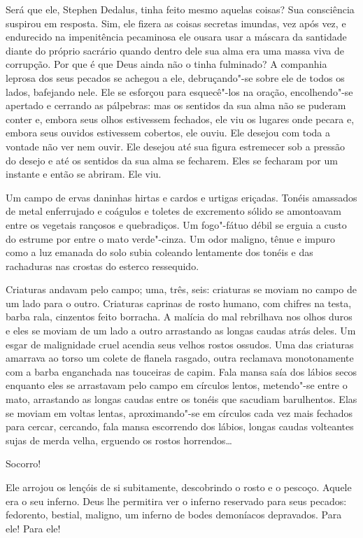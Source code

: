 Será que ele, Stephen Dedalus, tinha feito mesmo aquelas coisas? Sua
consciência suspirou em resposta. Sim, ele fizera as coisas secretas
imundas, vez após vez, e endurecido na impenitência pecaminosa ele
ousara usar a máscara da santidade diante do próprio sacrário quando
dentro dele sua alma era uma massa viva de corrupção. Por que é que
Deus ainda não o tinha fulminado? A companhia leprosa dos seus pecados
se achegou a ele, debruçando"-se sobre ele de todos os lados, bafejando
nele. Ele se esforçou para esquecê"-los na oração, encolhendo"-se
apertado e cerrando as pálpebras: mas os sentidos da sua alma não se
puderam conter e, embora seus olhos estivessem fechados, ele viu os
lugares onde pecara e, embora seus ouvidos estivessem cobertos, ele
ouviu. Ele desejou com toda a vontade não ver nem ouvir. Ele desejou
até sua figura estremecer sob a pressão do desejo e até os sentidos da
sua alma se fecharem. Eles se fecharam por um instante e então se
abriram. Ele viu.

Um campo de ervas daninhas hirtas e cardos e urtigas eriçadas. Tonéis
amassados de metal enferrujado e coágulos e toletes		
de excremento sólido se amontoavam entre os vegetais rançosos e
quebradiços. Um fogo"-fátuo débil se erguia a custo do estrume por entre
o mato verde"-cinza. Um odor maligno, tênue e impuro como a luz emanada
do solo subia coleando lentamente dos tonéis e das rachaduras nas
crostas do esterco ressequido.

Criaturas andavam pelo campo; uma, três, seis: criaturas se moviam no
campo de um lado para o outro. Criaturas caprinas de rosto
humano, com chifres na testa, barba rala, cinzentos feito borracha. A
malícia do mal rebrilhava nos olhos duros e eles se moviam de um lado a
outro arrastando as longas caudas atrás deles. Um esgar de malignidade
cruel acendia seus velhos rostos ossudos. Uma das criaturas amarrava ao
torso um colete de flanela rasgado, outra reclamava monotonamente com a
barba enganchada nas touceiras de capim. Fala mansa saía dos lábios
secos enquanto eles se arrastavam pelo campo em círculos lentos,
metendo"-se entre o mato, arrastando as longas caudas entre os tonéis
que sacudiam barulhentos. Elas se moviam em voltas lentas,
aproximando"-se em círculos cada vez mais fechados para cercar,
cercando, fala mansa escorrendo dos lábios, longas caudas volteantes
sujas de merda velha, erguendo os rostos horrendos\ldots{}

Socorro!

Ele arrojou os lençóis de si subitamente, descobrindo o rosto e o
pescoço. Aquele era o seu inferno. Deus lhe permitira ver o inferno
reservado para seus pecados: fedorento, bestial, maligno, um inferno de
bodes demoníacos depravados. Para ele! Para ele!

